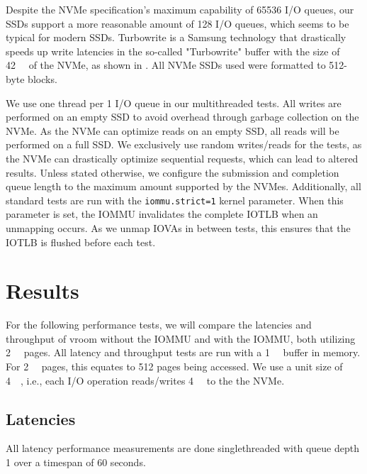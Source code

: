 Despite the NVMe specification's maximum capability of 65536 I/O queues, our SSDs support a more reasonable amount of 128 I/O queues, which seems to be typical for modern SSDs.
Turbowrite is a Samsung technology that drastically speeds up write latencies in the so-called "Turbowrite" buffer with the size of \qty{42}{\giga\byte} of the NVMe, as shown in \cite{vroom}. All NVMe SSDs used were formatted to 512-byte blocks.

We use one thread per 1 I/O queue in our multithreaded tests.
All writes are performed on an empty SSD to avoid overhead through garbage collection on the NVMe. As the NVMe can optimize reads on an empty SSD, all reads will be performed on a full SSD. We exclusively use random writes/reads for the tests, as the NVMe can drastically optimize sequential requests, which can lead to altered results.
Unless stated otherwise, we configure the submission and completion queue length to the maximum amount supported by the NVMes.
Additionally, all standard tests are run with the \texttt{iommu.strict=1} kernel parameter. When this parameter is set, the IOMMU invalidates the complete IOTLB when an unmapping occurs. As we unmap IOVAs in between tests, this ensures that the IOTLB is flushed before each test.

\section{Results}
For the following performance tests, we will compare the latencies and throughput of vroom without the IOMMU and with the IOMMU, both utilizing \qty{2}{\mebi\byte} pages. All latency and throughput tests are run with a \qty{1}{\gibi\byte} buffer in memory. For \qty{2}{\mebi\byte} pages, this equates to 512 pages being accessed. We use a unit size of \qty{4}{\kibi\byte}, i.e., each I/O operation reads/writes \qty{4}{\kibi\byte} to the the NVMe.

\subsection{Latencies}
All latency performance measurements are done singlethreaded with queue depth 1 over a timespan of 60 seconds.


